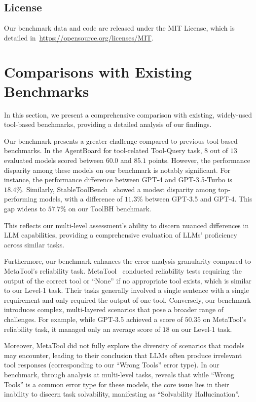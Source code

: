 \documentclass[11pt]{article}
\newcommand{\benchname}{ToolBH\xspace}
\begin{document}
\subsection{License}

Our benchmark data and code are released under the MIT License, which is detailed in~\url{https://opensource.org/licenses/MIT}.

\section{Comparisons with Existing Benchmarks}
\label{append:compare_benchmark}

In this section, we present a comprehensive comparison with existing, widely-used tool-based benchmarks, providing a detailed analysis of our findings.

Our benchmark presents a greater challenge compared to previous tool-based benchmarks.
In the AgentBoard for tool-related Tool-Query task\cite{DBLP:journals/corr/abs-2401-13178@agentboard}, $8$ out of $13$ evaluated models scored between $60.0$ and $85.1$ points.
However, the performance disparity among these models on our benchmark is notably significant.
For instance, the performance difference between GPT-4 and GPT-3.5-Turbo is $18.4\%$.
Similarly, StableToolBench~\cite{DBLP:journals/corr/abs-2403-07714@stabletoolbench} showed a modest disparity among top-performing models, with a difference of $11.3\%$ between GPT-3.5 and GPT-4.
This gap widens to $57.7\%$ on our \benchname benchmark.

This reflects our multi-level assessment's ability to discern nuanced differences in LLM capabilities, providing a comprehensive evaluation of LLMs' proficiency across similar tasks.

Furthermore, our benchmark enhances the error analysis granularity compared to MetaTool’s reliability task.
MetaTool~\cite{DBLP:journals/corr/abs-2310-03128@metatool} conducted reliability tests requiring the output of the correct tool or ``None'' if no appropriate tool exists, which is similar to our Level-1 task.
Their tasks generally involved a single sentence with a single requirement and only required the output of one tool.
Conversely, our benchmark introduces complex, multi-layered scenarios that pose a broader range of challenges.
For example, while GPT-3.5 achieved a score of $50.35$ on MetaTool’s reliability task, it managed only an average score of $18$ on our Level-1 task.

Moreover, MetaTool did not fully explore the diversity of scenarios that models may encounter, leading to their conclusion that LLMs often produce irrelevant tool responses (corresponding to our ``Wrong Tools'' error type). 
In our benchmark, through analysis at multi-level tasks, reveals that while ``Wrong Tools'' is a common error type for these models, the core issue lies in their inability to discern task solvability, manifesting as ``Solvability Hallucination''.
\end{document}
